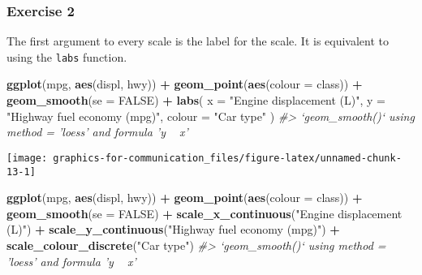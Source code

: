 \documentclass[]{book}
\newenvironment{Shaded}{\begin{snugshade}}{\end{snugshade}}
\newcommand{\CommentTok}[1]{\textcolor[rgb]{0.56,0.35,0.01}{\textit{#1}}}
\newcommand{\DataTypeTok}[1]{\textcolor[rgb]{0.13,0.29,0.53}{#1}}
\newcommand{\KeywordTok}[1]{\textcolor[rgb]{0.13,0.29,0.53}{\textbf{#1}}}
\newcommand{\NormalTok}[1]{#1}
\newcommand{\OperatorTok}[1]{\textcolor[rgb]{0.81,0.36,0.00}{\textbf{#1}}}
\newcommand{\OtherTok}[1]{\textcolor[rgb]{0.56,0.35,0.01}{#1}}
\newcommand{\StringTok}[1]{\textcolor[rgb]{0.31,0.60,0.02}{#1}}
\theoremstyle{plain}
\theoremstyle{remark}
\theoremstyle{definition}
\theoremstyle{definition}
\theoremstyle{definition}
\theoremstyle{remark}
\begin{document}
\hypertarget{exercise-2-72}{%
\subsubsection{Exercise 2}\label{exercise-2-72}}

The first argument to every scale is the label for the scale. It is
equivalent to using the \texttt{labs} function.

\begin{Shaded}
\begin{Highlighting}[]
\KeywordTok{ggplot}\NormalTok{(mpg, }\KeywordTok{aes}\NormalTok{(displ, hwy)) }\OperatorTok{+}
\StringTok{  }\KeywordTok{geom_point}\NormalTok{(}\KeywordTok{aes}\NormalTok{(}\DataTypeTok{colour =}\NormalTok{ class)) }\OperatorTok{+}
\StringTok{  }\KeywordTok{geom_smooth}\NormalTok{(}\DataTypeTok{se =} \OtherTok{FALSE}\NormalTok{) }\OperatorTok{+}
\StringTok{  }\KeywordTok{labs}\NormalTok{(}
    \DataTypeTok{x =} \StringTok{"Engine displacement (L)"}\NormalTok{,}
    \DataTypeTok{y =} \StringTok{"Highway fuel economy (mpg)"}\NormalTok{,}
    \DataTypeTok{colour =} \StringTok{"Car type"}
\NormalTok{  )}
\CommentTok{#> `geom_smooth()` using method = 'loess' and formula 'y ~ x'}
\end{Highlighting}
\end{Shaded}

\begin{center}\texttt{[image: graphics-for-communication\_files/figure-latex/unnamed-chunk-13-1]} \end{center}

\begin{Shaded}
\begin{Highlighting}[]
\KeywordTok{ggplot}\NormalTok{(mpg, }\KeywordTok{aes}\NormalTok{(displ, hwy)) }\OperatorTok{+}
\StringTok{  }\KeywordTok{geom_point}\NormalTok{(}\KeywordTok{aes}\NormalTok{(}\DataTypeTok{colour =}\NormalTok{ class)) }\OperatorTok{+}
\StringTok{  }\KeywordTok{geom_smooth}\NormalTok{(}\DataTypeTok{se =} \OtherTok{FALSE}\NormalTok{) }\OperatorTok{+}
\StringTok{  }\KeywordTok{scale_x_continuous}\NormalTok{(}\StringTok{"Engine displacement (L)"}\NormalTok{) }\OperatorTok{+}
\StringTok{  }\KeywordTok{scale_y_continuous}\NormalTok{(}\StringTok{"Highway fuel economy (mpg)"}\NormalTok{) }\OperatorTok{+}
\StringTok{  }\KeywordTok{scale_colour_discrete}\NormalTok{(}\StringTok{"Car type"}\NormalTok{)}
\CommentTok{#> `geom_smooth()` using method = 'loess' and formula 'y ~ x'}
\end{Highlighting}
\end{Shaded}
\end{document}
